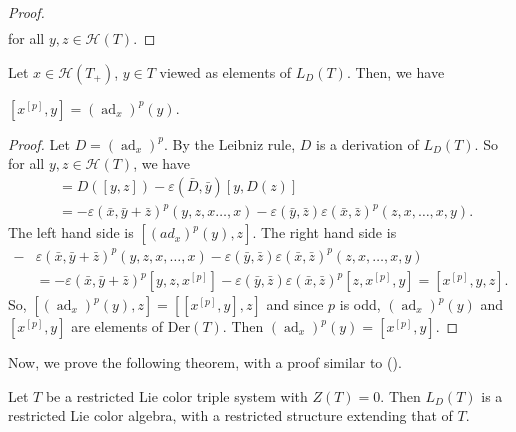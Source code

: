 \documentclass[11pt, twoside]{article}
\DeclareMathOperator{\ad}{ad}
\begin{document}
\begin{proof}
\begin{align*}
        \end{align*} for all $y,z\in \mathcal{H}(T) $.
   
\end{proof}

\begin{lem}\label{lem4.14}
    Let $x\in \mathcal{H}(T_+)$, $y\in T$ viewed as elements of $L_D(T) $. Then, we have \begin{center}
        $[x^{[p]},y]= (\ad_x)^p(y) $.
    \end{center}
\end{lem}

\begin{proof}
    Let $ D=(\ad_x)^p$. By the Leibniz rule, $D$ is a derivation of $L_D(T) $. So for all $y,z \in \mathcal{H}(T)$, we have \begin{align*}
        [D(y),z] &=D([y,z])-\varepsilon(\bar{D},\bar{y})[y,D(z)] \\ & = -\varepsilon(\bar{x},\bar{y}+\bar{z})^p(y,z,x\dots,x)-\varepsilon(\bar{y},\bar{z})\varepsilon(\bar{x},\bar{z})^p(z,x,\dots,x,y).
    \end{align*} The left hand side is $[(ad_x)^p(y),z] $. The right hand side is \begin{align*}  - & \varepsilon(\bar{x},\bar{y}+\bar{z})^p(y,z,x,\dots,x)-\varepsilon(\bar{y},\bar{z})\varepsilon(\bar{x},\bar{z})^p(z,x,\dots,x,y) \\ & =  -\varepsilon(\bar{x},\bar{y}+\bar{z})^p[y,z,x^{[p]}]-\varepsilon(\bar{y},\bar{z})\varepsilon(\bar{x},\bar{z})^p[z,x^{[p]},y] =[x^{[p]},y,z] .\end{align*} So, $[(\ad_x)^p(y),z]= [[x^{[p]},y],z] $ and since $p$ is odd, $(\ad_x)^p(y) $ and $[x^{[p]},y] $ are elements of $\mathrm{Der}(T)$. Then $(\ad_x)^p(y)= [x^{[p]},y] $.
\end{proof}
Now, we prove the following theorem, with a proof similar to (\cite[Theorem $3.25 $]{H01}).

\begin{thm}\label{thm4.15}
    Let $T$ be a restricted Lie color triple system with $Z(T)=0$. Then $L_D(T)$ is a restricted Lie color algebra, with a restricted structure extending that of $T$.
\end{thm}
\end{document}
